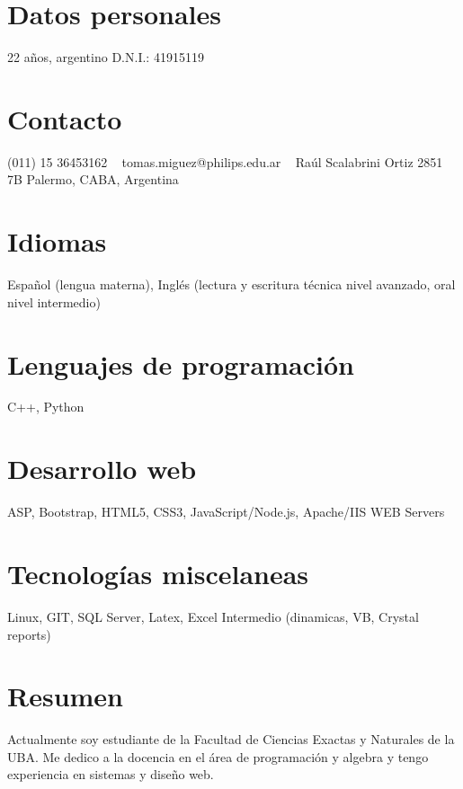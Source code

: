 \documentclass[espanol]{cv-style}     %
\begin{document}
\lastupdated

\begin{aside}
%
\section{Datos personales}
22 años, argentino
D.N.I.: 41915119
%
\section{Contacto}
(011) 15 36453162
~
tomas.miguez@philips.edu.ar
~
Raúl Scalabrini Ortiz 2851 7B
Palermo, CABA, Argentina
%
\section{Idiomas}
Español (lengua materna),
Inglés (lectura y escritura técnica nivel avanzado, oral nivel intermedio)
%
\section{Lenguajes de programación}
C++, Python
%
\section{Desarrollo web}
ASP, Bootstrap, HTML5, CSS3, JavaScript/Node.js, Apache/IIS WEB Servers
%
\section{Tecnologías miscelaneas}
Linux, GIT, SQL Server, Latex, Excel Intermedio (dinamicas, VB, Crystal reports)
%
\end{aside}
\vspace{0.2cm}
\section{Resumen}
  \vspace{-0.2cm}
Actualmente soy estudiante de la Facultad de Ciencias Exactas y Naturales de la UBA. Me dedico a la docencia en el área de programación y algebra y tengo experiencia en sistemas y diseño web. 
\end{document}
